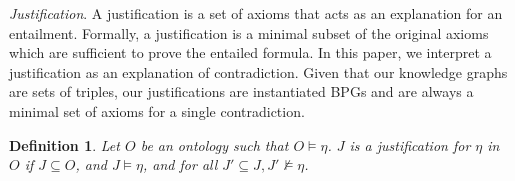 \documentclass[11pt,letterpaper ,oneside ]{book}
\newtheorem{definition}{Definition}
\begin{document}
	\textit{Justification}. A justification\cite{Horridge:2009} is a set of axioms that acts as an explanation for an entailment.
	Formally, a justification is a minimal subset of the original axioms which are sufficient to prove the entailed formula. In this paper, we interpret a justification as an explanation of contradiction. Given that our knowledge graphs are sets of triples, our justifications are instantiated BPGs and are always a minimal set of axioms for a single contradiction. \\
	\begin{definition} 
		Let $O$ be an ontology such that $O \models \eta$. $J$ is a justification for $\eta$ in $O$ if $J \subseteq O$, and $J \models \eta$, and for all $J'\subseteq J, J' \not\models \eta$.  \cite{Horridge:2009}
	\end{definition}
	
\end{document}
